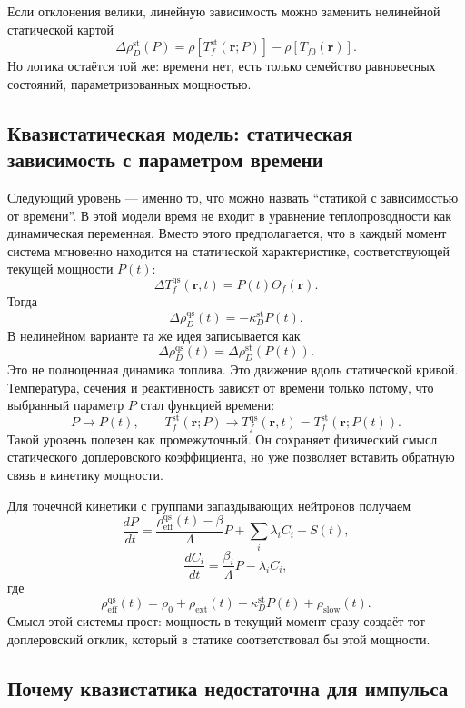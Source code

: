 \documentclass[12pt]{article}
\begin{document}
Если отклонения велики, линейную зависимость можно заменить нелинейной статической картой
\[
\Delta\rho_D^{\mathrm{st}}(P)
=
\rho[T_f^{\mathrm{st}}(\mathbf r;P)]-
\rho[T_{f0}(\mathbf r)].
\]
Но логика остаётся той же: времени нет, есть только семейство равновесных состояний, параметризованных мощностью.

\subsection{Квазистатическая модель: статическая зависимость с параметром времени}

Следующий уровень --- именно то, что можно назвать ``статикой с зависимостью от времени''. В этой модели время не входит в уравнение теплопроводности как динамическая переменная. Вместо этого предполагается, что в каждый момент система мгновенно находится на статической характеристике, соответствующей текущей мощности \(P(t)\):
\[
\Delta T_f^{\mathrm{qs}}(\mathbf r,t)
=
P(t)\Theta_f(\mathbf r).
\]
Тогда
\[
\boxed{
\Delta\rho_D^{\mathrm{qs}}(t)
=
-\kappa_D^{\mathrm{st}}P(t).
}
\]
В нелинейном варианте та же идея записывается как
\[
\Delta\rho_D^{\mathrm{qs}}(t)
=
\Delta\rho_D^{\mathrm{st}}(P(t)).
\]
Это не полноценная динамика топлива. Это движение вдоль статической кривой. Температура, сечения и реактивность зависят от времени только потому, что выбранный параметр \(P\) стал функцией времени:
\[
P
\longrightarrow
P(t),
\qquad
T_f^{\mathrm{st}}(\mathbf r;P)
\longrightarrow
T_f^{\mathrm{qs}}(\mathbf r,t)=T_f^{\mathrm{st}}(\mathbf r;P(t)).
\]
Такой уровень полезен как промежуточный. Он сохраняет физический смысл статического доплеровского коэффициента, но уже позволяет вставить обратную связь в кинетику мощности.

Для точечной кинетики с группами запаздывающих нейтронов \cite{DuderstadtHamilton1976} получаем
\[
\frac{dP}{dt}
=
\frac{\rho_{\mathrm{eff}}^{\mathrm{qs}}(t)-\beta}{\Lambda}P
+
\sum_i\lambda_i C_i+S(t),
\]
\[
\frac{dC_i}{dt}
=
\frac{\beta_i}{\Lambda}P-\lambda_iC_i,
\]
где
\[
\rho_{\mathrm{eff}}^{\mathrm{qs}}(t)
=
\rho_0+
\rho_{\mathrm{ext}}(t)
-
\kappa_D^{\mathrm{st}}P(t)
+
\rho_{\mathrm{slow}}(t).
\]
Смысл этой системы прост: мощность в текущий момент сразу создаёт тот доплеровский отклик, который в статике соответствовал бы этой мощности.

\subsection{Почему квазистатика недостаточна для импульса}
\end{document}

